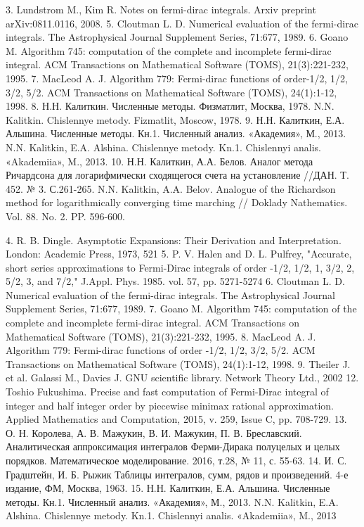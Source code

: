 
3. Lundstrom M., Kim R. Notes on fermi-dirac integrals. Arxiv preprint
arXiv:0811.0116, 2008.
5. Cloutman L. D. Numerical evaluation of the fermi-dirac integrals. The Astrophysical
Journal Supplement Series, 71:677, 1989.
6. Goano M. Algorithm 745: computation of the complete and incomplete fermi-dirac
integral. ACM Transactions on Mathematical Software (TOMS),
21(3):221-232, 1995.
7. MacLeod A. J. Algorithm 779: Fermi-dirac functions of order-1/2, 1/2, 3/2, 5/2.
ACM Transactions on Mathematical Software (TOMS), 24(1):1-12, 1998.
8. Н.Н. Калиткин. Численные методы. Физматлит, Москва, 1978.
N.N. Kalitkin. Chislennye metody. Fizmatlit, Moscow, 1978.
9. Н.Н. Калиткин, Е.А. Альшина. Численные методы. Кн.1. Численный анализ. «Академия», М., 2013.
N.N. Kalitkin, E.A. Alshina. Chislennye metody. Kn.1. Chislennyi analis.
«Akademiia», M., 2013.
10. Н.Н. Калиткин, А.А. Белов. Аналог метода Ричардсона для логарифмически сходящегося счета на установление //ДАН. Т. 452. № 3. С.261-265.
N.N. Kalitkin, A.A. Belov. Analogue of the Richardson method for logarithmically
converging time marching // Doklady Nathematics. Vol. 88. No. 2. PP. 596-600.

4. R. B. Dingle. Asymptotic Expansions: Their Derivation and Interpretation.
London: Academic Press, 1973, 521
5. P. V. Halen and D. L. Pulfrey, "Accurate, short series approximations to
Fermi-Dirac integrals of order -1/2, 1/2, 1, 3/2, 2, 5/2, 3, and 7/2," J.Appl.
Phys. 1985. vol. 57, pp. 5271-5274
6. Cloutman L. D. Numerical evaluation of the fermi-dirac integrals. The
Astrophysical Journal Supplement Series, 71:677, 1989.
7. Goano M. Algorithm 745: computation of the complete and incomplete fermi-dirac integral. ACM Transactions on Mathematical Software (TOMS), 21(3):221-232, 1995.
8. MacLeod A. J. Algorithm 779: Fermi-dirac functions of order -1/2, 1/2, 3/2,
5/2. ACM Transactions on Mathematical Software (TOMS), 24(1):1-12, 1998.
9. Theiler J. et al. Galassi M., Davies J. GNU scientific library. Network Theory
Ltd., 2002
12. Toshio Fukushima. Precise and fast computation of Fermi-Dirac integral of
integer and half integer order by piecewise minimax rational approximation.
Applied Mathematics and Computation, 2015, v. 259, Issue C, pp. 708-729.
13. О. Н. Королева, А. В. Мажукин, В. И. Мажукин, П. В. Бреславский.
Аналитическая аппроксимация интегралов Ферми-Дирака полуцелых и
целых порядков. Математическое моделирование. 2016, т.28, № 11, с.
55-63.
14. И. С. Градштейн, И. Б. Рыжик Таблицы интегралов, сумм, рядов и произведений. 4-е издание, ФМ, Москва, 1963.
15. Н.Н. Калиткин, Е.А. Альшина. Численные методы. Кн.1. Численный
анализ. «Академия», М., 2013. N.N. Kalitkin, E.A.
Alshina. Chislennye metody. Kn.1. Chislennyi analis. «Akademiia», M., 2013

